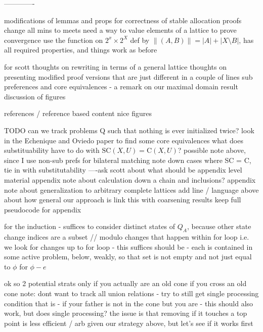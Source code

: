 \documentclass[11pt,reqno]{amsart}
\theoremstyle{definition}
\numberwithin{equation}{section}
\newcommand{\pre}{\phi}
\newcommand{\strcore}{\mathrm{SC}(X,U)}
\newcommand{\core}{\mathrm{C}(X,U)}
\newcommand{\acta}{Q_A}
\begin{document}
-------------





modifications of lemmas and props for correctness of stable allocation proofs
    change all mins to meets
    need a way to value elements of a lattice to prove convergence 
    use the function on $2^x \times 2^X$ def by $\|(A,B) \| = |A| + |X \setminus B|$, has all required properties, and things work as before


for scott 
    thoughts on rewriting in terms of a general lattice
    thoughts on presenting modified proof versions that are just different in a couple of lines
    sub preferences and core equivalences - a remark on our maximal domain result
    discussion of figures 



references / reference based content
nice figures


TODO
can we track problems Q such that nothing is ever initialized twice? 
look in the Echenique and Oviedo paper to find some core equivalences
what does substituability have to do with $\strcore = \core$?
    possible note above, since I use non-sub prefs for bilateral matching
note down cases where SC = C, tie in with substitutability
----ask scott about what should be appendix level material 
appendix note about calculation down a chain and inclusions?
appendix note about generalization to arbitrary complete lattices
add line / language above about how general our approach is
link this with coarsening results
keep full pseudocode for appendix




for the induction - suffices to consider distinct states of $\acta$, because other state change indices are a subset // modulo changes that happen within for loop i.e. we look for changes up to for loop - this suffices
    should be - each is contained in some active problem, below, weakly, so that set is not empty and not just equal to $\pre$ for $\pre - e$

ok so 2 potential strats
    only if you actually are an old cone 
    if you cross an old cone 
        note: dont want to track all union relations - try to still get single processing condition
        that is - if your father is not in the cone but you are - this should also work, but does single processing? 
        the issue is that removing if it touches a top point is less efficient / arb given our strategy above, but let's see if it works first 
\end{document}
